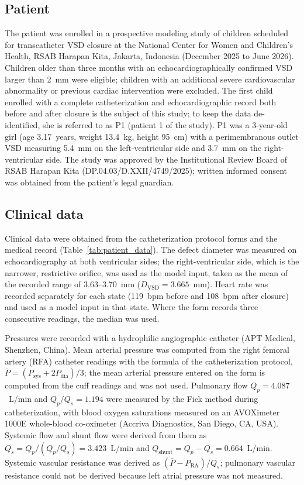 \documentclass{article}
\begin{document}
\subsection{Patient}
\label{sec:study_population}
The patient was enrolled in a prospective modeling study of children scheduled for transcatheter VSD closure at the National Center for Women and Children's Health, RSAB Harapan Kita, Jakarta, Indonesia (December 2025 to June 2026). Children older than three months with an echocardiographically confirmed VSD larger than 2~mm were eligible; children with an additional severe cardiovascular abnormality or previous cardiac intervention were excluded. The first child enrolled with a complete catheterization and echocardiographic record both before and after closure is the subject of this study; to keep the data de-identified, she is referred to as P1 (patient 1 of the study). P1 was a 3-year-old girl (age 3.17~years, weight 13.4~kg, height 95~cm) with a perimembranous outlet VSD measuring 5.4~mm on the left-ventricular side and 3.7~mm on the right-ventricular side. The study was approved by the Institutional Review Board of RSAB Harapan Kita (DP.04.03/D.XXII/4749/2025); written informed consent was obtained from the patient's legal guardian.

\subsection{Clinical data}
\label{sec:data}
Clinical data were obtained from the catheterization protocol forms and the medical record (Table~\ref{tab:patient_data}). The defect diameter was measured on echocardiography at both ventricular sides; the right-ventricular side, which is the narrower, restrictive orifice, was used as the model input, taken as the mean of the recorded range of 3.63--3.70~mm ($D_{\mathrm{VSD}} = 3.665$~mm). Heart rate was recorded separately for each state (119~bpm before and 108~bpm after closure) and used as a model input in that state. Where the form records three consecutive readings, the median was used.

Pressures were recorded with a hydrophilic angiographic catheter (APT Medical, Shenzhen, China). Mean arterial pressure was computed from the right femoral artery (RFA) catheter readings with the formula of the catheterization protocol, $\overline{P} = (P_{\mathrm{sys}} + 2P_{\mathrm{dia}})/3$; the mean arterial pressure entered on the form is computed from the cuff readings and was not used. Pulmonary flow $Q_p = 4.087$~L/min and $Q_p/Q_s = 1.194$ were measured by the Fick method during catheterization, with blood oxygen saturations measured on an AVOXimeter 1000E whole-blood co-oximeter (Accriva Diagnostics, San Diego, CA, USA). Systemic flow and shunt flow were derived from them as $Q_s = Q_p/(Q_p/Q_s) = 3.423$~L/min and $Q_{\mathrm{shunt}} = Q_p - Q_s = 0.664$~L/min. Systemic vascular resistance was derived as $(\overline{P} - P_{\mathrm{RA}})/Q_s$; pulmonary vascular resistance could not be derived because left atrial pressure was not measured.
\end{document}
